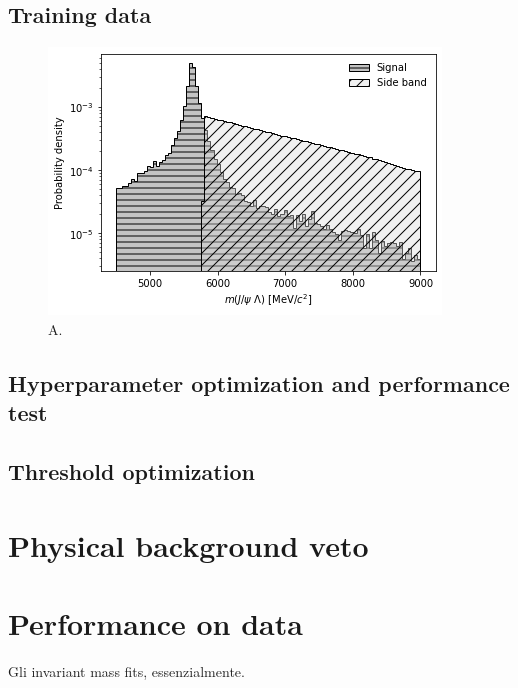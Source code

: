 \subsection{Training data}

\begin{figure}[t]
	\centering
	\includegraphics[width=.6\textwidth]{graphics/04-event_selection/hbdt_signal_sidebands.png}
	\caption{A.}
	\label{fig:4:HBDT_training_data}
\end{figure}

\subsection{Hyperparameter optimization and performance test}

\subsection{Threshold optimization}

\section{Physical background veto}
\label{sec:B0_veto}

\section{Performance on data}
Gli invariant mass fits, essenzialmente.